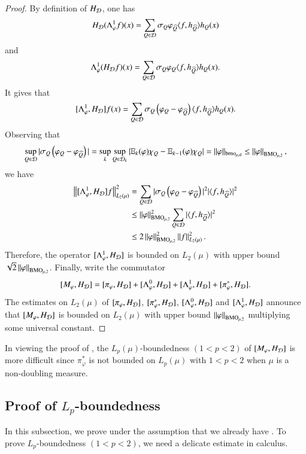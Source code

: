 \documentclass[leqno]{amsart}
\begin{document}
\begin{proof}
By definition of $H_{{\mathcal D}}$, one has
\begin{align*}
H_{{\mathcal D}}(\Lambda^{1}_{\varphi}f)(x)=\sum_{Q\in{\mathcal D}}\sigma_{Q}\varphi_{\widehat{Q}}\langle f,h_{\widehat{Q}} \rangle h_{Q}(x)
\end{align*}
and
\begin{align*}
\Lambda^{1}_{\varphi}(H_{{\mathcal D}}f)(x)=\sum_{Q\in{\mathcal D}}\sigma_{Q}\varphi_{Q}\langle f,h_{\widehat{Q}} \rangle h_{Q}(x).
\end{align*}
It gives that $$[\Lambda^{1}_{\varphi},H_{{\mathcal D}}]f(x)=
\sum_{Q\in{\mathcal D}}\sigma_{Q}\left(\varphi_{Q}-\varphi_{\widehat{Q}}\right)\langle f,h_{\widehat{Q}} \rangle h_{Q}(x).$$
Observing that $$\sup_{Q\in{\mathcal D}}|\sigma_{Q}\left(\varphi_{Q}-\varphi_{\widehat{Q}}\right)|=\sup_k\sup_{Q\in \mathcal{D}_k}|\mathbb{E}_k(\varphi)\chi_Q-\mathbb{E}_{k-1}(\varphi)\chi_{Q}|=\|\varphi\|_{{\rm bmo}_{\mu,\mathsf{d}}}\leq\left\| \varphi \right\|_{{\rm BMO}_{\mu,2}},$$
we have
\begin{align*}
\left\| [\Lambda^{1}_{\varphi},H_{{\mathcal D}}]f \right\|_{L_{2}(\mu)}^{2}
&=\sum_{Q\in{\mathcal D}}|\sigma_{Q}\left(\varphi_{Q}-\varphi_{\widehat{Q}}\right)|^{2}|\langle f,h_{\widehat{Q}} \rangle|^{2}\\
&\leq\left\| \varphi \right\|_{{\rm BMO}_{\mu,2}}^{2}\sum_{Q\in{\mathcal D}}|\langle f,h_{\widehat{Q}} \rangle|^{2}\\
&\leq2\left\| \varphi \right\|_{{\rm BMO}_{\mu,2}}^{2}\left\| f \right\|_{L_{2}(\mu)}^{2}.
\end{align*}
Therefore, the operator $[\Lambda^{1}_{\varphi},H_{{\mathcal D}}]$ is bounded on $L_{2}(\mu)$ with upper bound $\sqrt{2}\left\| \varphi \right\|_{{\rm BMO}_{\mu,2}}$. Finally, write the commutator $$[M_{\varphi},H_{{\mathcal D}}]=[\pi_{\varphi},H_{{\mathcal D}}]+[\Lambda^{0}_{\varphi},H_{{\mathcal D}}]
+[\Lambda^{1}_{\varphi},H_{{\mathcal D}}]+[\pi_{\varphi}^{*},H_{{\mathcal D}}].$$ The estimates on $L_{2}(\mu)$ of $[\pi_{\varphi},H_{{\mathcal D}}]$, $[\pi_{\varphi}^{*},H_{{\mathcal D}}]$, $[\Lambda^{0}_{\varphi},H_{{\mathcal D}}]$ and $[\Lambda^{1}_{\varphi},H_{{\mathcal D}}]$ announce that $[M_{\varphi},H_{{\mathcal D}}]$ is bounded on $L_{2}(\mu)$ with upper bound $\left\| \varphi \right\|_{{\rm BMO}_{\mu,2}}$ multiplying some universal constant.

\end{proof}

\begin{remark}
In viewing the proof of , the $L_{p}(\mu)$-boundedness $(1<p<2)$ of $[M_{\varphi},H_{{\mathcal D}}]$ is more difficult since $\pi_{\varphi}^{*}$ is not bounded on $L_{p}(\mu)$ with $1<p<2$ when $\mu$ is a non-doubling measure.
\end{remark}

\subsection{Proof of $L_{p}$-boundedness}
In this subsection, we prove  under the assumption that we already have . To prove $L_{p}$-boundedness $(1<p<2)$, we need a delicate estimate in calculus.
\end{document}

